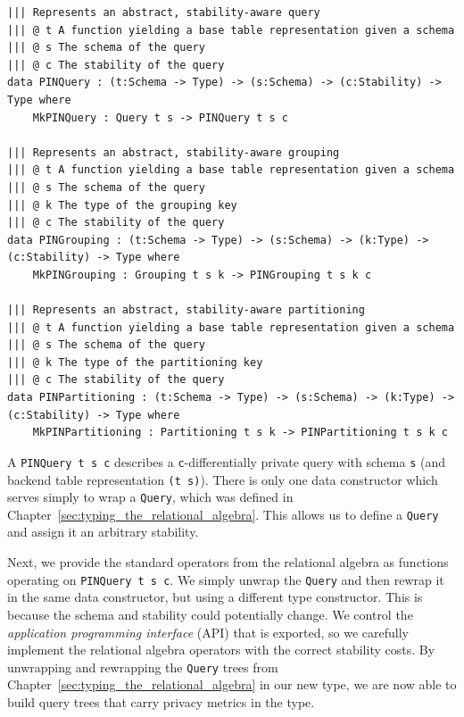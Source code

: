 \documentclass[12pt]{report}
\begin{document}
\begin{lstlisting}[caption={Representing privacy-aware queries},label={lst:pinqueries}]
||| Represents an abstract, stability-aware query
||| @ t A function yielding a base table representation given a schema
||| @ s The schema of the query
||| @ c The stability of the query
data PINQuery : (t:Schema -> Type) -> (s:Schema) -> (c:Stability) -> Type where
    MkPINQuery : Query t s -> PINQuery t s c

||| Represents an abstract, stability-aware grouping
||| @ t A function yielding a base table representation given a schema
||| @ s The schema of the query
||| @ k The type of the grouping key
||| @ c The stability of the query
data PINGrouping : (t:Schema -> Type) -> (s:Schema) -> (k:Type) -> (c:Stability) -> Type where
    MkPINGrouping : Grouping t s k -> PINGrouping t s k c

||| Represents an abstract, stability-aware partitioning
||| @ t A function yielding a base table representation given a schema
||| @ s The schema of the query
||| @ k The type of the partitioning key
||| @ c The stability of the query
data PINPartitioning : (t:Schema -> Type) -> (s:Schema) -> (k:Type) -> (c:Stability) -> Type where
    MkPINPartitioning : Partitioning t s k -> PINPartitioning t s k c
\end{lstlisting}

A \texttt{PINQuery t s c} describes a \texttt{c}-differentially private query with schema \texttt{s} (and backend table representation \texttt{(t s)}).
There is only one data constructor which serves simply to wrap a \texttt{Query}, which was defined in Chapter~\ref{sec:typing_the_relational_algebra}.
This allows us to define a \texttt{Query} and assign it an arbitrary stability.

Next, we provide the standard operators from the relational algebra as functions operating on \texttt{PINQuery t s c}.
We simply unwrap the \texttt{Query} and then rewrap it in the same data constructor, but using a different type constructor.
This is because the schema and stability could potentially change.
We control the \textit{application programming interface} (API) that is exported, so we carefully implement the relational algebra operators with the correct stability costs.
By unwrapping and rewrapping the \texttt{Query} trees from Chapter~\ref{sec:typing_the_relational_algebra} in our new type, we are now able to build query trees that carry privacy metrics in the type.
\end{document}
